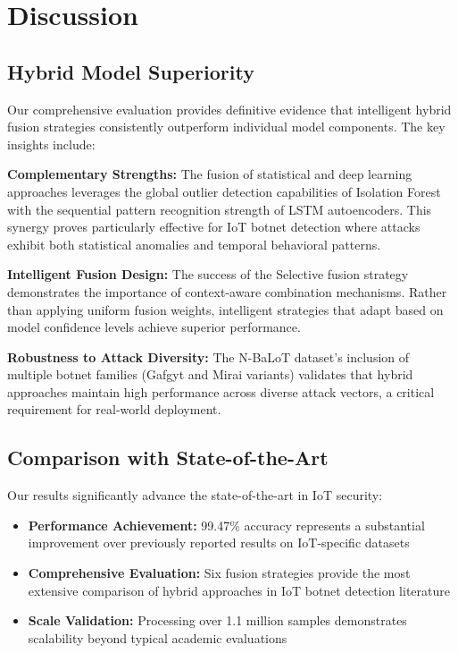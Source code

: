 \documentclass[conference]{IEEEtran}
\begin{document}
\section{Discussion}

\subsection{Hybrid Model Superiority}
Our comprehensive evaluation provides definitive evidence that intelligent hybrid fusion strategies consistently outperform individual model components. The key insights include:

\textbf{Complementary Strengths:} The fusion of statistical and deep learning approaches leverages the global outlier detection capabilities of Isolation Forest with the sequential pattern recognition strength of LSTM autoencoders. This synergy proves particularly effective for IoT botnet detection where attacks exhibit both statistical anomalies and temporal behavioral patterns.

\textbf{Intelligent Fusion Design:} The success of the Selective fusion strategy demonstrates the importance of context-aware combination mechanisms. Rather than applying uniform fusion weights, intelligent strategies that adapt based on model confidence levels achieve superior performance.

\textbf{Robustness to Attack Diversity:} The N-BaLoT dataset's inclusion of multiple botnet families (Gafgyt and Mirai variants) validates that hybrid approaches maintain high performance across diverse attack vectors, a critical requirement for real-world deployment.

\subsection{Comparison with State-of-the-Art}
Our results significantly advance the state-of-the-art in IoT security:
\begin{itemize}
    \item \textbf{Performance Achievement:} 99.47\% accuracy represents a substantial improvement over previously reported results on IoT-specific datasets
    \item \textbf{Comprehensive Evaluation:} Six fusion strategies provide the most extensive comparison of hybrid approaches in IoT botnet detection literature
    \item \textbf{Scale Validation:} Processing over 1.1 million samples demonstrates scalability beyond typical academic evaluations
\end{itemize}
\end{document}
